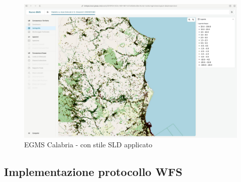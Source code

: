 \begin{figure}[htbp]
      \centering
      \includegraphics[width=1\textwidth]{Tesi/images/Capitolo5/calabriaSLDLegenda.jpg}
      \caption{EGMS Calabria - con stile SLD applicato}
      \label{fig:calabriaSLDLegenda}
\end{figure}

\subsection{Implementazione protocollo WFS}

